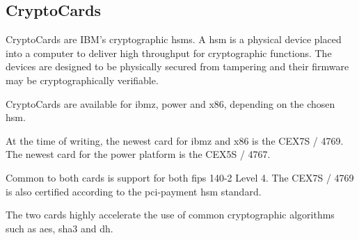 \subsection{CryptoCards}

CryptoCards are IBM's cryptographic \glspl{hsm}. A \gls{hsm} is a physical device placed into a computer to deliver high throughput for cryptographic functions. The devices are designed to be physically secured from tampering and their firmware may be cryptographically verifiable\cite{ibm:hsms}.

CryptoCards are available for \gls{ibmz}, \gls{power} and \gls{x86}, depending on the chosen \gls{hsm}.

At the time of writing, the newest card for \gls{ibmz} and \gls{x86} is the CEX7S / 4769\cite{ibm:4769}. The newest card for the \gls{power} platform is the CEX5S / 4767\cite{ibm:4767}.

Common to both cards is support for both \gls{fips} 140-2 Level 4. The CEX7S / 4769 is also certified according to the \gls{pci-payment} \gls{hsm} standard\cite{ibm:4769,ibm:4767}.

The two cards highly accelerate the use of common cryptographic algorithms such as \gls{aes}, \gls{sha3} and \gls{dh}\cite{ibm:4767,ibm:4769}.